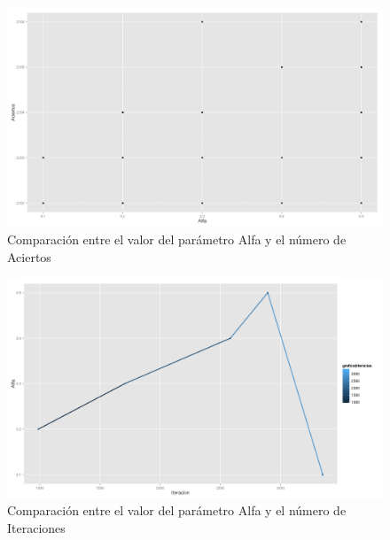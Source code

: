 \documentclass[8.5pt,twoside,twocolumn]{article}
\begin{document}
	\begin{figure}[h]
	  \centering
	  \includegraphics[scale=0.2]{adult_alfa_points_iteracion_iteinal.png}
	  \caption{Comparaci\'on entre el valor del par\'ametro Alfa y el n\'umero de Aciertos}
	  \label{fgr:alfaIteracion}
	\end{figure}

	\begin{figure}[h]
	  \centering
	  \includegraphics[scale=0.2]{adult_alfa_iteracion_promedio_final.png}
	  \caption{Comparaci\'on entre el valor del par\'ametro Alfa y el n\'umero de Iteraciones}
	  \label{fgr:alfaIteracion}
	\end{figure}
\end{document}
